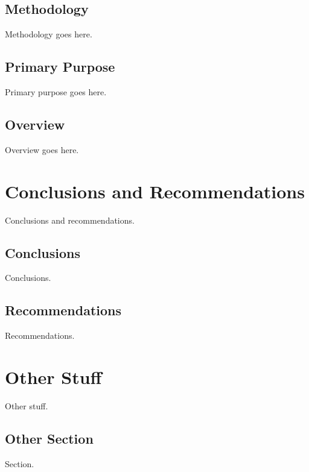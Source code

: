 \documentclass{kuthesis}
\begin{document}
\section{Methodology}
Methodology goes here.
\section{Primary Purpose}
Primary purpose goes here.
\section{Overview}
Overview goes here.

\chapter{Conclusions and Recommendations}
Conclusions and recommendations.
\section{Conclusions}
Conclusions.
\section{Recommendations}
Recommendations.

\chapter{Other Stuff}
Other stuff.
\section{Other Section}
Section.
\end{document}
